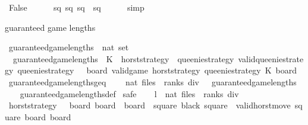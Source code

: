 \begin{isabellebody}
\ False\isanewline
\ \ \ \ \isamarkupfalse%
\ sq{}\ sq{}\ {\isacharbackquoteopen}sq{}\ {\isasymnoteq}\ sq{}{\isacharbackquoteclose}\isanewline
\ \ \ \ \isamarkupfalse%
\ simp\isanewline
{}\isamarkupfalse%
%
\endisatagproof
{\isafoldproof}%
%
\isadelimproof
%
\endisadelimproof
%
\begin{isamarkuptext}%
guaranteed game lengths%
\end{isamarkuptext}\isamarkuptrue%
\isamarkupfalse%
\ guaranteed{\isacharunderscore}game{\isacharunderscore}lengths\ {\isacharcolon}{\isacharcolon}\ {\isachardoublequoteopen}nat\ set{\isachardoublequoteclose}\ \isanewline
\ \ {\isachardoublequoteopen}guaranteed{\isacharunderscore}game{\isacharunderscore}lengths\ {\isacharequal}\ {\isacharbraceleft}K{\isachardot}\ {\isasymexists}\ horst{\isacharunderscore}strategy{\isachardot}\ {\isasymforall}\ queenie{\isacharunderscore}strategy{\isachardot}\ valid{\isacharunderscore}queenie{\isacharunderscore}strategy\ queenie{\isacharunderscore}strategy\ {\isasymlongrightarrow}\ {\isacharparenleft}{\isasymexists}\ board{\isachardot}\ valid{\isacharunderscore}game\ horst{\isacharunderscore}strategy\ queenie{\isacharunderscore}strategy\ K\ board{\isacharparenright}{\isacharbraceright}{\isachardoublequoteclose}\isanewline
\isanewline
{}\isamarkupfalse%
\ guaranteed{\isacharunderscore}game{\isacharunderscore}lengths{\isacharunderscore}geq{\isacharcolon}\ \isanewline
\ \ \ {\isachardoublequoteopen}nat\ {\isacharparenleft}{\isacharparenleft}files\ {\isacharasterisk}\ ranks{\isacharparenright}\ div\ {}{\isacharparenright}\ {\isasymin}\ guaranteed{\isacharunderscore}game{\isacharunderscore}lengths{\isachardoublequoteclose}\isanewline
%
\isadelimproof
\ \ %
\endisadelimproof
%
\isatagproof
{}\isamarkupfalse%
\ guaranteed{\isacharunderscore}game{\isacharunderscore}lengths{\isacharunderscore}def\isanewline
{}\isamarkupfalse%
\ safe\isanewline
\ \ \isamarkupfalse%
\ {\isacharquery}l\ {\isacharequal}\ {\isachardoublequoteopen}nat\ {\isacharparenleft}{\isacharparenleft}files\ {\isacharasterisk}\ ranks{\isacharparenright}\ div\ {}{\isacharparenright}{\isachardoublequoteclose}\isanewline
\ \ \isamarkupfalse%
\ {\isacharquery}horst{\isacharunderscore}strategy\ {\isacharequal}\ {\isachardoublequoteopen}{\isasymlambda}\ board\ board{\isacharprime}\ {\isacharcolon}{\isacharcolon}\ board{\isachardot}\ {\isacharparenleft}{\isasymexists}\ square{\isachardot}\ black\ square\ {\isasymand}\ valid{\isacharunderscore}horst{\isacharunderscore}move{\isacharprime}\ square\ board\ board{\isacharprime}{\isacharparenright}{\isachardoublequoteclose}\isanewline

\end{isabellebody}
